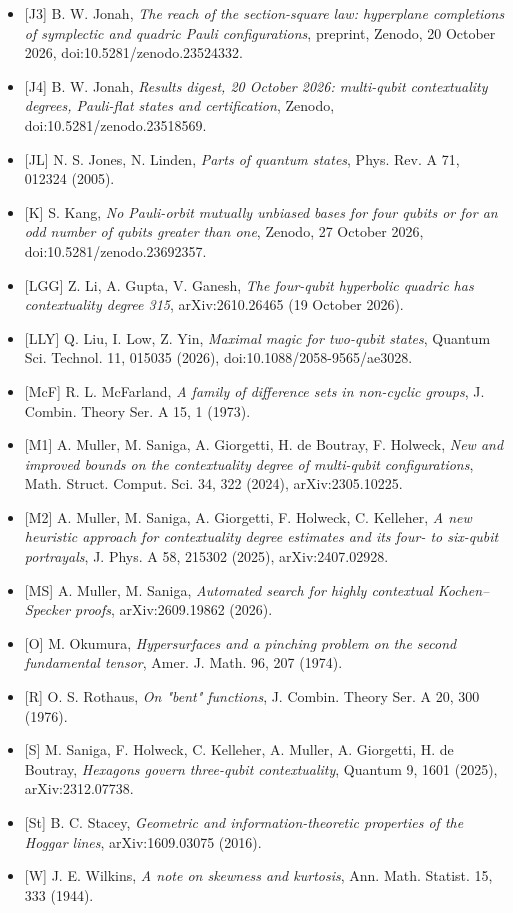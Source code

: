 \documentclass[11pt,a4paper]{article}
\begin{document}
\begin{itemize}
\item
  {[}J3{]} B. W. Jonah, \emph{The reach of the section-square law: hyperplane completions of symplectic and quadric Pauli configurations}, preprint, Zenodo, 20 October 2026, doi:10.5281/zenodo.23524332.
\item
  {[}J4{]} B. W. Jonah, \emph{Results digest, 20 October 2026: multi-qubit contextuality degrees, Pauli-flat states and certification}, Zenodo, doi:10.5281/zenodo.23518569.
\item
  {[}JL{]} N. S. Jones, N. Linden, \emph{Parts of quantum states}, Phys. Rev. A 71, 012324 (2005).
\item
  {[}K{]} S. Kang, \emph{No Pauli-orbit mutually unbiased bases for four qubits or for an odd number of qubits greater than one}, Zenodo, 27 October 2026, doi:10.5281/zenodo.23692357.
\item
  {[}LGG{]} Z. Li, A. Gupta, V. Ganesh, \emph{The four-qubit hyperbolic quadric has contextuality degree 315}, arXiv:2610.26465 (19 October 2026).
\item
  {[}LLY{]} Q. Liu, I. Low, Z. Yin, \emph{Maximal magic for two-qubit states}, Quantum Sci. Technol. 11, 015035 (2026), doi:10.1088/2058-9565/ae3028.
\item
  {[}McF{]} R. L. McFarland, \emph{A family of difference sets in non-cyclic groups}, J. Combin. Theory Ser. A 15, 1 (1973).
\item
  {[}M1{]} A. Muller, M. Saniga, A. Giorgetti, H. de Boutray, F. Holweck, \emph{New and improved bounds on the contextuality degree of multi-qubit configurations}, Math. Struct. Comput. Sci. 34, 322 (2024), arXiv:2305.10225.
\item
  {[}M2{]} A. Muller, M. Saniga, A. Giorgetti, F. Holweck, C. Kelleher, \emph{A new heuristic approach for contextuality degree estimates and its four- to six-qubit portrayals}, J. Phys. A 58, 215302 (2025), arXiv:2407.02928.
\item
  {[}MS{]} A. Muller, M. Saniga, \emph{Automated search for highly contextual Kochen--Specker proofs}, arXiv:2609.19862 (2026).
\item
  {[}O{]} M. Okumura, \emph{Hypersurfaces and a pinching problem on the second fundamental tensor}, Amer. J. Math. 96, 207 (1974).
\item
  {[}R{]} O. S. Rothaus, \emph{On "bent" functions}, J. Combin. Theory Ser. A 20, 300 (1976).
\item
  {[}S{]} M. Saniga, F. Holweck, C. Kelleher, A. Muller, A. Giorgetti, H. de Boutray, \emph{Hexagons govern three-qubit contextuality}, Quantum 9, 1601 (2025), arXiv:2312.07738.
\item
  {[}St{]} B. C. Stacey, \emph{Geometric and information-theoretic properties of the Hoggar lines}, arXiv:1609.03075 (2016).
\item
  {[}W{]} J. E. Wilkins, \emph{A note on skewness and kurtosis}, Ann. Math. Statist. 15, 333 (1944).
\end{itemize}
\end{document}
